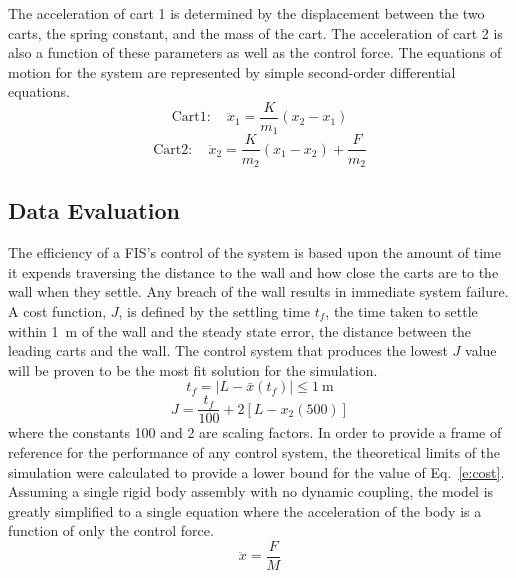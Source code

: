 The acceleration of cart 1 is determined by the displacement between the two carts, the spring constant, and
the mass of the cart. The acceleration of cart 2 is also a function of these parameters as well as the control
force. The equations of motion for the system are represented by simple second-order differential equations.
\begin{equation}
\label{e:cart1} \mathrm{Cart 1:}\quad \ddot{x}_1=\frac{K}{m_1}(x_2-x_1) 
\end{equation}
\begin{equation}
    \label{e:cart2} \mathrm{Cart 2:}\quad \ddot{x}_2=\frac{K}{m_2}(x_1-x_2)+\frac{F}{m_2}
\end{equation} 

\subsection{Data Evaluation} The efficiency of a FIS's control of the system is based upon the amount of time
it expends traversing the distance to the wall and how close the carts are to the wall when they settle. Any
breach of the wall results in immediate system failure. A cost function, $J$, is defined by the settling time
$t_f$, the time taken to settle within \SI{1}{\metre} of the wall and the steady state error, the distance
between the leading carts and the wall. The control system that produces the lowest $J$ value will be proven
to be the most fit solution for the simulation.  
\begin{equation}\label{e:timesettle}
t_f=|L-\bar{x}(t_f)|\le\SI{1}{\metre}
\end{equation} 
\begin{equation}\label{e:cost}
J=\frac{t_f}{100}+2[L-x_2(500)]
\end{equation} where the constants 100
    and 2 are scaling factors. In order to provide a frame of reference for the performance of any control
    system, the theoretical limits of the simulation were calculated to provide a lower bound for the value of
    Eq.~\eqref{e:cost}. Assuming a single rigid body assembly with no dynamic coupling, the model is greatly
    simplified to a single equation where the acceleration of the body is a function of only the control
    force.
\begin{equation}
    \label{e:simplemodel} \ddot{x}=\frac{F}{M}
\end{equation}
